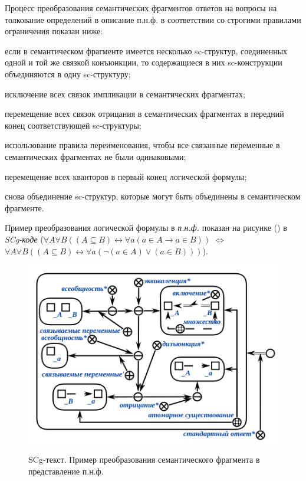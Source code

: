 Процесс преобразования семантических фрагментов ответов на вопросы на толкование определений в описание п.н.ф. в соответствии со строгими правилами ограничения показан ниже:

\begin{textitemize}
	\item если в семантическом фрагменте имеется несколько sc-структур, соединенных одной и той же связкой конъюнкции, то содержащиеся в них sc-конструкции объединяются в одну sc-структуру;
	
	\item исключение всех связок импликации в семантических фрагментах;
	
	\item перемещение всех связок отрицания в семантических фрагментах в передний конец соответствующей sc-структуры;
	
	\item использование правила переименования, чтобы все связанные переменные в семантических фрагментах не были одинаковыми;
	
	\item перемещение всех кванторов в первый конец логической формулы;
	
	\item снова объединение sc-структур, которые могут быть объединены в семантическом фрагменте.
	
\end{textitemize}

Пример преобразования логической формулы в \textit{п.н.ф.} показан на рисунке (\textit{}) в \textit{SCg-коде} ($\forall A\forall B((A\subseteq B) \leftrightarrow \forall a(a\in A\rightarrow a\in B))$ $\Leftrightarrow$ $\forall A\forall B((A\subseteq B) \leftrightarrow \forall a ( \neg ( a\in A ) \lor (a\in B)))$).

\begin{figure}[H]
	\caption{SCg-текст. Пример преобразования семантического фрагмента в представление п.н.ф.}
	\includegraphics[scale=0.8]{author/part7/figures/PNF_example.png}
	\label{fig:PNF_example}
\end{figure}

